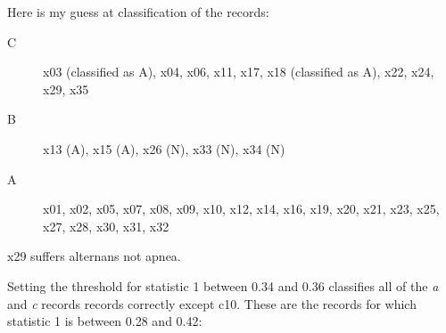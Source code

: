 \documentclass[12pt]{article}
\begin{document}
Here is my guess at classification of the records:
\begin{description}
\item[C]
  x03 (classified as A),
  x04,
  x06,
  x11,
  x17,
  x18 (classified as A),
  x22,
  x24,
  x29,
  x35
\item[B]
  x13 (A),
  x15 (A),
  x26 (N),
  x33 (N),
  x34 (N)
\item[A]
  x01, x02, x05, x07, x08, x09, x10, x12, x14, x16, x19, x20,
  x21, x23, x25, x27, x28, x30, x31, x32
\end{description}

x29 suffers alternans not apnea.

Setting the threshold for statistic 1 between 0.34 and 0.36 classifies
all of the \emph{a} and \emph{c} records records correctly except c10.  These are the records for which statistic 1 is between 0.28
and 0.42:
\end{document}
